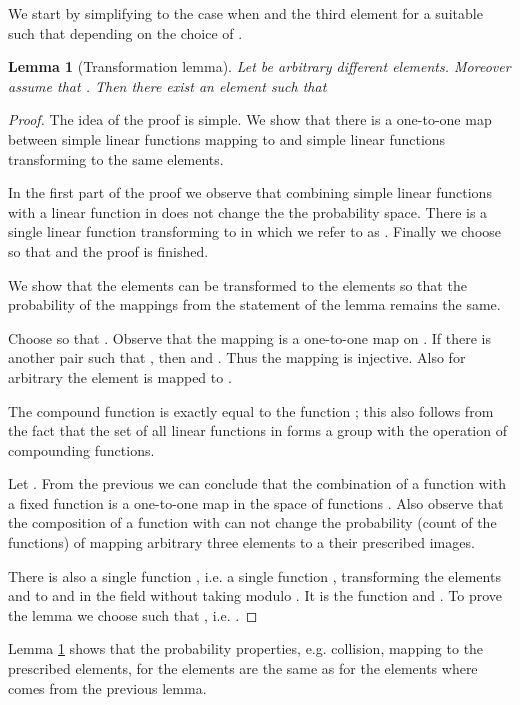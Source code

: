 \documentclass{article}
\newtheorem{lemma}{Lemma}
\begin{document}
We start by simplifying to the case when  and the third element  for a suitable  such that  depending on the choice of .

\begin{lemma}[Transformation lemma]
\label{lemma:transformation}
Let  be arbitrary different elements. Moreover assume that . Then there exist an element  such that

\end{lemma}
\begin{proof}
The idea of the proof is simple. We show that there is a one-to-one map between simple linear functions mapping  to  and simple linear functions transforming  to the same elements.

In the first part of the proof we observe that combining simple linear functions with a linear function in  does not change the the probability space.
There is a single linear function transforming  to  in  which we refer to as .
Finally we choose  so that  and the proof is finished.

We show that the elements  can be transformed to the elements  so that the probability of the mappings from the statement of the lemma remains the same.

Choose  so that .
Observe that the mapping  is a one-to-one map on .
If there is another pair  such that , then  and . Thus the mapping is injective.
Also for arbitrary  the element  is mapped to .

The compound function  is exactly equal to the function ; this also follows from the fact that the set of all linear functions in  forms a group with the operation of compounding functions. 

Let .
From the previous we can conclude that the combination of a function  with a fixed function  is a one-to-one map in the space of functions .
Also observe that the composition of a function  with  can not change the probability (count of the functions) of mapping arbitrary three elements to a their prescribed images.

There is also a single function , i.e. a single function , transforming the elements  and  to  and  in the field  without taking modulo . It is the function  and .
To prove the lemma we choose  such that , i.e. .
\end{proof}

Lemma \ref{lemma:transformation} shows that the probability properties, e.g. collision, mapping to the prescribed elements, for the elements  are the same as for the elements  where  comes from the previous lemma.
\end{document}
